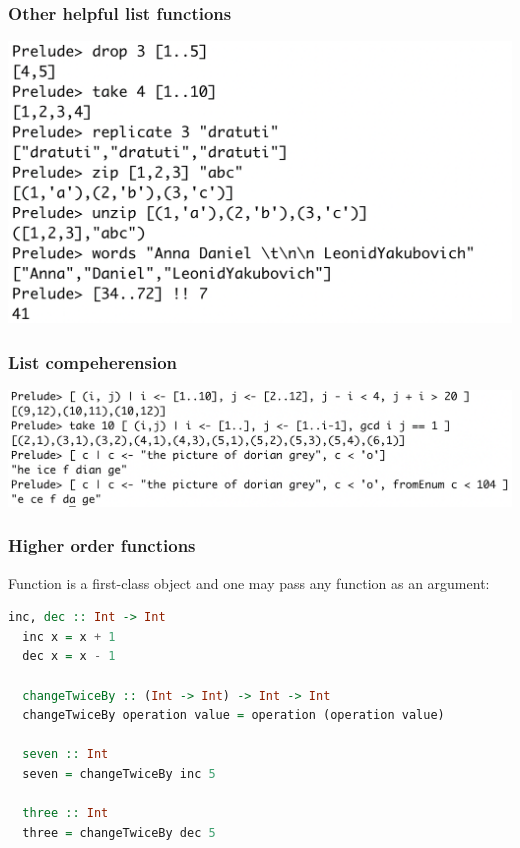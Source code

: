 \documentclass[10pt,pdf,utf8,russian,aspectratio=169]{beamer}
\begin{document}
\begin{frame}
  \frametitle{Other helpful list functions}

  \begin{center}
  \includegraphics[scale=0.5]{Pics/ListFunctions.png}
  \end{center}

\end{frame}

\begin{frame}
  \frametitle{List compeherension}

  \begin{center}
  \includegraphics[scale=0.47]{Pics/Compr.png}
  \end{center}
\end{frame}

\begin{frame}[fragile]
  \frametitle{Higher order functions}

  Function is a first-class object and one may pass any function as an argument:

  \begin{lstlisting}[language=Haskell]
  inc, dec :: Int -> Int
  inc x = x + 1
  dec x = x - 1

  changeTwiceBy :: (Int -> Int) -> Int -> Int
  changeTwiceBy operation value = operation (operation value)

  seven :: Int
  seven = changeTwiceBy inc 5

  three :: Int
  three = changeTwiceBy dec 5
  \end{lstlisting}
\end{frame}
\end{document}
